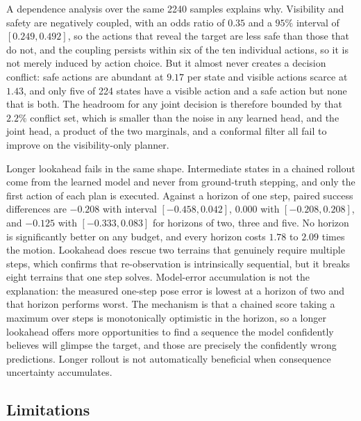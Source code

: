 \documentclass[conference]{IEEEtran}
\begin{document}
A dependence analysis over the same 2240 samples explains why. Visibility and safety
are negatively coupled, with an odds ratio of $0.35$ and a $95\%$ interval of
$[0.249, 0.492]$, so the actions that reveal the target are less safe than those that
do not, and the coupling persists within six of the ten individual actions, so it is
not merely induced by action choice. But it almost never creates a decision conflict:
safe actions are abundant at $9.17$ per state and visible actions scarce at $1.43$,
and only five of 224 states have a visible action and a safe action but none that is
both. The headroom for any joint decision is therefore bounded by that $2.2\%$
conflict set, which is smaller than the noise in any learned head, and the joint head,
a product of the two marginals, and a conformal filter all fail to improve on the
visibility-only planner.

Longer lookahead fails in the same shape. Intermediate states in a chained rollout
come from the learned model and never from ground-truth stepping, and only the first
action of each plan is executed. Against a horizon of one step, paired success
differences are $-0.208$ with interval $[-0.458, 0.042]$, $0.000$ with
$[-0.208, 0.208]$, and $-0.125$ with $[-0.333, 0.083]$ for horizons of two, three and
five. No horizon is significantly better on any budget, and every horizon costs $1.78$
to $2.09$ times the motion. Lookahead does rescue two terrains that genuinely require
multiple steps, which confirms that re-observation is intrinsically sequential, but it
breaks eight terrains that one step solves. Model-error accumulation is not the
explanation: the measured one-step pose error is lowest at a horizon of two and that
horizon performs worst. The mechanism is that a chained score taking a maximum over
steps is monotonically optimistic in the horizon, so a longer lookahead offers more
opportunities to find a sequence the model confidently believes will glimpse the
target, and those are precisely the confidently wrong predictions. Longer rollout is
not automatically beneficial when consequence uncertainty accumulates.

\subsection{Limitations}
\end{document}
